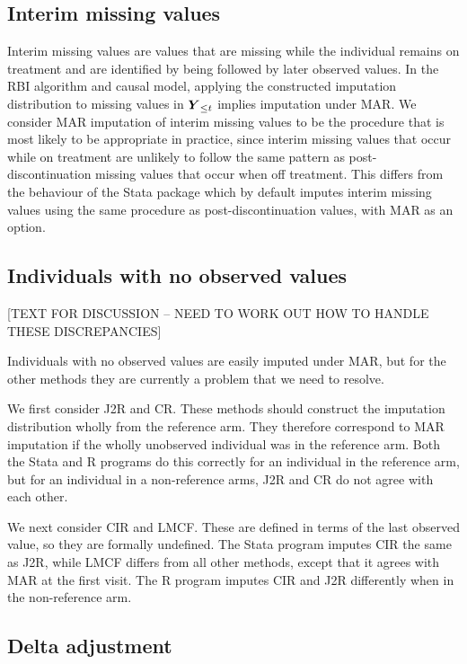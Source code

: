 \subsection{Interim missing values}

Interim missing values are values that are missing while the individual remains on treatment and are identified by being followed by later observed values. 
In the RBI algorithm and causal model, applying the constructed imputation distribution to missing values in $\boldsymbol{Y}_{{\le{t}}}$ implies imputation under MAR.
We consider MAR imputation of interim missing values to be the procedure that is most likely to be appropriate in practice, since interim missing values that occur while on treatment are unlikely to follow the same pattern as post-discontinuation missing values that occur when off treatment. 
This differs from the behaviour of the Stata package \citep{Cro++16} which by default imputes interim missing values using the same procedure as post-discontinuation values, with MAR as an option.

\subsection{Individuals with no observed values}

[TEXT FOR DISCUSSION -- NEED TO WORK OUT HOW TO HANDLE THESE DISCREPANCIES]

Individuals with no observed values are easily imputed under MAR, but for the other methods they are currently a problem that we need to resolve.

We first consider J2R and CR. 
These methods should construct the imputation distribution wholly from the reference arm. 
They therefore correspond to MAR imputation if the wholly unobserved individual was in the reference arm. 
Both the Stata and R programs do this correctly for an individual in the reference arm, but for an individual in a non-reference arms, J2R and CR do not agree with each other.

We next consider CIR and LMCF. These are defined in terms of the last observed value, so they are formally undefined. 
The Stata program imputes CIR the same as J2R, while LMCF differs from all other methods, except that it agrees with MAR at the first visit.
The R program imputes CIR and J2R differently when in the non-reference arm.




\subsection{Delta adjustment}

